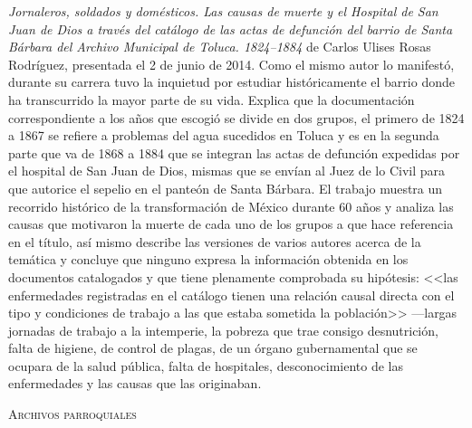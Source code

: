 \noindent \textsl{Jornaleros, soldados y domésticos. Las 
causas de muerte y el Hospital de San Juan de Dios a través del 
catálogo de las actas de defunción del barrio de Santa Bárbara del 
Archivo Municipal de Toluca. 1824--1884} de Carlos Ulises Rosas 
Rodríguez, presentada el 2 de junio de 2014. Como el mismo autor lo 
manifestó, durante su carrera tuvo la inquietud por estudiar 
históricamente el barrio donde ha transcurrido la mayor parte de su 
vida. Explica que la documentación  correspondiente a los años que 
escogió se divide en dos grupos, el primero de 1824 a 1867 se refiere a 
problemas del agua sucedidos en Toluca y es en la segunda parte que va 
de 1868 a 1884  que se integran las actas de defunción expedidas por el 
hospital de San Juan de Dios, mismas que se envían al Juez de lo Civil 
para que autorice el sepelio en el panteón de Santa Bárbara. El trabajo 
muestra un recorrido histórico de la transformación de México durante 
60 años y analiza las causas que motivaron la  muerte de cada uno de 
los grupos a que hace referencia en el título, así mismo describe las 
versiones de varios autores acerca de la temática y concluye que 
ninguno expresa la información obtenida en los documentos catalogados y 
que tiene plenamente comprobada su hipótesis: <<las enfermedades 
registradas en el catálogo tienen una relación causal directa con el 
tipo y condiciones de trabajo a las que estaba sometida la población>> 
---largas jornadas de trabajo a la intemperie, la pobreza que trae 
consigo desnutrición, falta de higiene, de control de plagas, de un 
órgano gubernamental que se ocupara de la salud pública, falta de 
hospitales, desconocimiento de las enfermedades y las causas que las 
originaban.
\enlargethispage{\baselineskip}

\medskip
\noindent \textsc{Archivos parroquiales}

